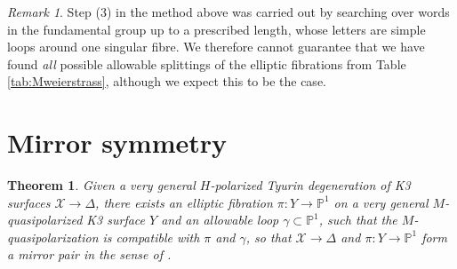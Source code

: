 \documentclass[a4paper]{amsart}
\theoremstyle{definition}
\theoremstyle{plain}
\newtheorem{theorem}[definition]{Theorem}
\theoremstyle{remark}
\newtheorem{remark}[definition]{Remark}
\newcommand{\bP}{\mathbb{P}}
\newcommand{\calX}{\mathcal{X}}
\numberwithin{figure}{section}
\numberwithin{table}{section}
\begin{document}
\begin{remark} Step (3) in the method above was carried out by searching over words in the fundamental group up to a prescribed length, whose letters are simple loops around one singular fibre. We therefore cannot guarantee that we have found \emph{all} possible allowable splittings of the elliptic fibrations from Table \ref{tab:Mweierstrass}, although we expect this to be the case. \end{remark}

\section{Mirror symmetry}

\begin{theorem}\label{thm:mirror}
Given a very general $H$-polarized Tyurin degeneration of K3 surfaces $\calX \to \Delta$, there exists an elliptic fibration $\pi\colon Y \to \bP^1$  on a very general $M$-quasi\-polarized  K3 surface $Y$ and an allowable loop $\gamma \subset \bP^1$, such that the $M$-quasipolarization is compatible with $\pi$ and $\gamma$, so that $\calX \to \Delta$ and $\pi\colon Y \to \bP^1$ form a mirror pair in the sense of \cite[Definition 5.1]{dfk3slpms}.
\end{theorem}
\end{document}

